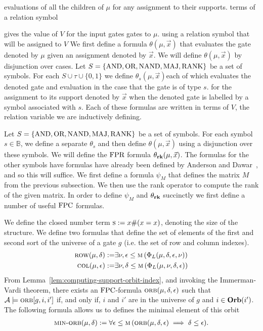 \documentclass[../paper.tex]{subfiles}
\begin{document}
evaluations of all the children of $\mu$ for any assignment to their supports.
terms of a relation symbol

gives the value of $V$ for the input gates gates to $\mu$. using a relation
symbol that will be assigned to $V$ We first define a formula $\theta(\mu,
\vec{x})$ that evaluates the gate denoted by $\mu$ given an assignment denoted
by $\vec{x}$. We will define $\theta(\mu, \vec{x})$ by disjunction over cases.
Let $S = \{\text{\upshape AND}, \text{\upshape OR}, \text{\upshape NAND}, \text{\upshape MAJ}, \text{\upshape RANK}\}$ be a set of symbols. For each $S \cup
\tau \cup \{0,1\}$ we define $\theta_s (\mu, \vec{x})$each of which evaluates
the denoted gate and evaluation in the case that the gate is of type $s$. for
the assignment to its support denoted by $\vec{x}$ when the denoted gate is
labelled by a symbol associated with $s$. Each of these formulas are written in
terms of $V$, the relation variable we are inductively defining.

Let $S = \{\text{\upshape AND}, \text{\upshape OR}, \text{\upshape NAND}, \text{\upshape MAJ}, \text{\upshape RANK}\}$ be a set of symbols. For each symbol
$s \in \mathbb{B}$, we define a separate $\theta_s$ and then define $\theta(\mu,
\vec{x})$ using a disjunction over these symbols. We will define the $\text{\upshape FPR}$
formula $\theta_{\text{\textbf{rk}}} (\mu, \vec{x})$. The formulas for the other symbols have
formulas have already been defined by Anderson and Dawar~\cite{AndersonD17}, and
so this will suffice. We first define a formula $\psi_M$ that defines the matrix
$M$ from the previous subsection. We then use the rank operator to compute the
rank of the given matrix. In order to define $\psi_M$ and $\theta_{\text{\textbf{rk}}}$
succinctly we first define a number of useful $\text{\upshape FPC}$ formulas.

We define the closed number term $\textsc{s} := x\# (x = x)$, denoting the size of
the structure. We define two formulas that define the set of elements of the
first and second sort of the universe of a gate $g$ (i.e. the set of row and
column indexes).
\begin{align*}
	\textsc{row} (\mu, \delta) :=   & \exists \nu, \epsilon \leq \textsc{m} \, (\Phi_L (\mu, \delta, \epsilon, \nu)) \\
	\textsc{col} (\mu, \epsilon) := & \exists \nu, \delta \leq \textsc{m} \, (\Phi_L (\mu, \nu, \delta , \epsilon))  
\end{align*}
From Lemma~\ref{lem:computing-support-orbit-index}, and invoking the
Immerman-Vardi theorem, there exists an $\text{\upshape FPC}$-formula $\textsc{orb}(\mu, \delta,
\epsilon)$ such that $\mathcal{A} \models \textsc{orb}[g,i, i']$ if, and only if,
$i$ and $i'$ are in the universe of $g$ and $i \in \text{\textbf{Orb}}(i')$. The following
formula allows us to defines the minimal element of this orbit
\begin{align*}
	\textsc{min-orb} (\mu, \delta) := \forall \epsilon \leq \textsc{m} \, (\textsc{orb} (\mu, \delta, \epsilon) \implies \delta \leq \epsilon). 
\end{align*}
\end{document}
